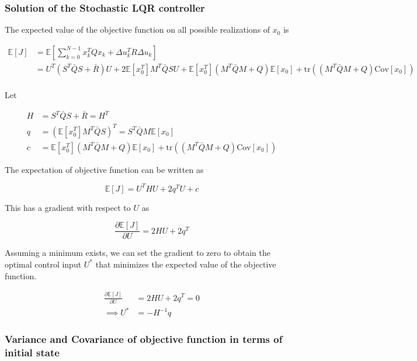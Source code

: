 \documentclass{article}
\begin{document}
\subsubsection{Solution of the Stochastic LQR controller}

The expected value of the objective function on all possible realizations of $x_0$ is

\begin{equation}
  \begin{aligned}
    \mathbb{E}[J] &= \mathbb{E}[\sum_{k=0}^{N-1} x_k^T Q x_k + \Delta u_k^T R \Delta u_k] \\
    &= U^T (S^T \bar{Q} S + \bar{R}) U + 2 \mathbb{E}[x_0^T] M^T \bar{Q} S U + \mathbb{E}[x_0^T] (M^T \bar{Q} M + Q) \mathbb{E}[x_0] + \text{tr}((M^T \bar{Q} M + Q) \text{Cov}[x_0]) \\
  \end{aligned}
\end{equation}

Let

$$
\begin{aligned}
  H &= S^T \bar{Q} S + \bar{R} = H^T \\
  q &= (\mathbb{E}[x_0^T] M^T \bar{Q} S)^T = S^T \bar{Q} M \mathbb{E}[x_0] \\
  c &= \mathbb{E}[x_0^T] (M^T \bar{Q} M + Q) \mathbb{E}[x_0] + \text{tr}((M^T \bar{Q} M + Q) \text{Cov}[x_0])
\end{aligned}
$$

The expectation of objective function can be written as

$$
\mathbb{E}[J] = U^T H U + 2 q^T U + c
$$

This has a gradient with respect to $U$ as

$$
\frac{\partial \mathbb{E}[J]}{\partial U} = 2 H U + 2 q^T
$$

Assuming a minimum exists, we can set the gradient to zero to obtain the optimal control input $U^*$ that minimizes the expected value of the objective function.

\begin{equation}
  \begin{aligned}
    \frac{\partial \mathbb{E}[J]}{\partial U} &= 2 H U + 2 q^T = 0 \\
    \implies U^* &= -H^{-1} q
  \end{aligned}
\end{equation}

\subsubsection{Variance and Covariance of objective function in terms of initial state}
\end{document}
